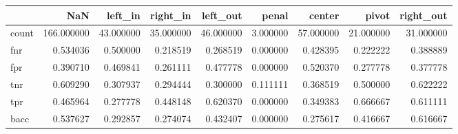 \begin{tabular}{lrrrrrrrr}
\toprule
{} &         NaN &    left\_in &   right\_in &   left\_out &     penal &     center &      pivot &  right\_out \\
\midrule
count &  166.000000 &  43.000000 &  35.000000 &  46.000000 &  3.000000 &  57.000000 &  21.000000 &  31.000000 \\
fnr   &    0.534036 &   0.500000 &   0.218519 &   0.268519 &  0.000000 &   0.428395 &   0.222222 &   0.388889 \\
fpr   &    0.390710 &   0.469841 &   0.261111 &   0.477778 &  0.000000 &   0.520370 &   0.277778 &   0.377778 \\
tnr   &    0.609290 &   0.307937 &   0.294444 &   0.300000 &  0.111111 &   0.368519 &   0.500000 &   0.622222 \\
tpr   &    0.465964 &   0.277778 &   0.448148 &   0.620370 &  0.000000 &   0.349383 &   0.666667 &   0.611111 \\
bacc  &    0.537627 &   0.292857 &   0.274074 &   0.432407 &  0.000000 &   0.275617 &   0.416667 &   0.616667 \\
\bottomrule
\end{tabular}

